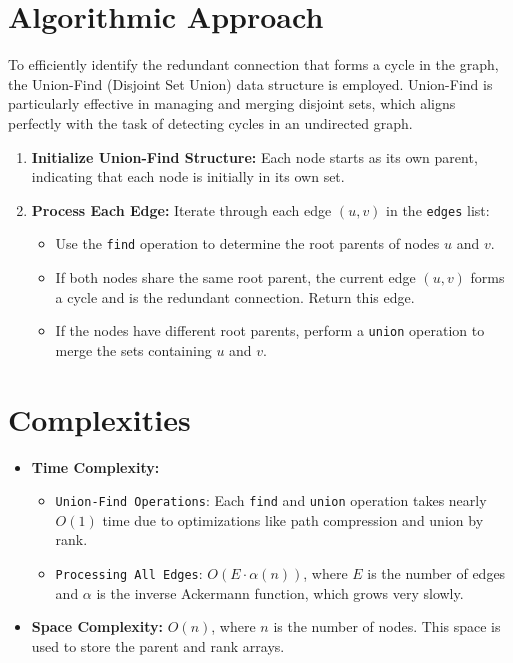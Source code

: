 \section*{Algorithmic Approach}

To efficiently identify the redundant connection that forms a cycle in the graph, the Union-Find (Disjoint Set Union) data structure is employed. Union-Find is particularly effective in managing and merging disjoint sets, which aligns perfectly with the task of detecting cycles in an undirected graph.

\begin{enumerate}
    \item \textbf{Initialize Union-Find Structure:}  
    Each node starts as its own parent, indicating that each node is initially in its own set.
    
    \item \textbf{Process Each Edge:}  
    Iterate through each edge \((u, v)\) in the \texttt{edges} list:
    \begin{itemize}
        \item Use the \texttt{find} operation to determine the root parents of nodes \(u\) and \(v\).
        \item If both nodes share the same root parent, the current edge \((u, v)\) forms a cycle and is the redundant connection. Return this edge.
        \item If the nodes have different root parents, perform a \texttt{union} operation to merge the sets containing \(u\) and \(v\).
    \end{itemize}
\end{enumerate}


\section*{Complexities}

\begin{itemize}
    \item \textbf{Time Complexity:}
    \begin{itemize}
        \item \texttt{Union-Find Operations}: Each \texttt{find} and \texttt{union} operation takes nearly \(O(1)\) time due to optimizations like path compression and union by rank.
        \item \texttt{Processing All Edges}: \(O(E \cdot \alpha(n))\), where \(E\) is the number of edges and \(\alpha\) is the inverse Ackermann function, which grows very slowly.
    \end{itemize}
    \item \textbf{Space Complexity:} \(O(n)\), where \(n\) is the number of nodes. This space is used to store the parent and rank arrays.
\end{itemize}


